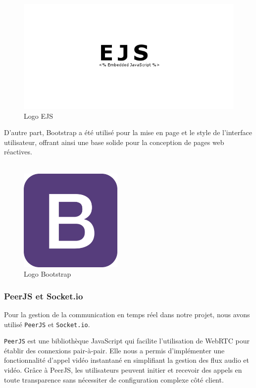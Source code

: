 {\begin{figure}[H]
\begin{center}
\includegraphics[width=15cm]{assets/presentation/ejs.png}
\end{center}
\caption{Logo EJS}
\end{figure}

D'autre part, Bootstrap a été utilisé pour la mise en page et le style de l'interface utilisateur, offrant ainsi une base solide pour la conception de pages web réactives.\\\\

\begin{figure}[H]
\begin{center}
\includegraphics[width=5cm]{assets/presentation/Bootstrap_Logo-700x700.png}
\end{center}
\caption{Logo Bootstrap}
\end{figure}

\subsubsection*{PeerJS et Socket.io}  
Pour la gestion de la communication en temps réel dans notre projet, nous avons utilisé \verb|PeerJS| et \verb|Socket.io|.  

\verb|PeerJS| est une bibliothèque JavaScript qui facilite l'utilisation de WebRTC pour établir des connexions pair-à-pair. Elle nous a permis d'implémenter une fonctionnalité d'appel vidéo instantané en simplifiant la gestion des flux audio et vidéo. Grâce à PeerJS, les utilisateurs peuvent initier et recevoir des appels en toute transparence sans nécessiter de configuration complexe côté client.  

}
